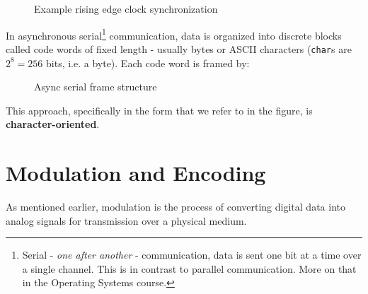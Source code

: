 \begin{figure}[h]
    \centering
    \caption{Example rising edge clock synchronization}\label{fig:clock_sync}
\end{figure}

\vfill
In asynchronous serial\footnote{
    Serial - \textit{one after another} - communication, data is sent one bit at a time over a single channel. This is in contrast to parallel communication. More on that in the Operating Systems course.
} communication, data is organized into discrete blocks called code words of fixed length - usually bytes or ASCII characters (\texttt{char}s are $2^8 = 256$ bits, i.e. a byte). Each code word is framed by:

\begin{figure}[h]
    \centering
    
    \caption{Async serial frame structure}\label{fig:async_frame}
\end{figure}

This approach, specifically in the form that we refer to in the figure, is \textbf{character-oriented}.
\newpage
\section{Modulation and Encoding}\label{sec:modulation}
As mentioned earlier, modulation is the process of converting digital data into analog signals for transmission over a physical medium.


